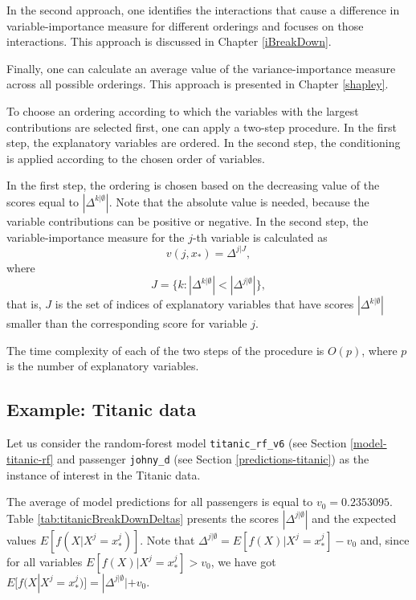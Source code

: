 \documentclass[12pt,]{krantz}
\begin{document}
In the second approach, one identifies the interactions that cause a difference in variable-importance measure for different orderings and focuses on those interactions. This approach is discussed in Chapter \ref{iBreakDown}.

Finally, one can calculate an average value of the variance-importance measure across all possible orderings. This approach is presented in Chapter \ref{shapley}.

To choose an ordering according to which the variables with the largest contributions are selected first, one can apply a two-step procedure. In the first step, the explanatory variables are ordered. In the second step, the conditioning is applied according to the chosen order of variables.

In the first step, the ordering is chosen based on the decreasing value of the scores equal to \(|\Delta^{k|\emptyset}|\). Note that the absolute value is needed, because the variable contributions can be positive or negative. In the second step, the variable-importance measure for the \(j\)-th variable is calculated as
\[
v(j, x_*) = \Delta ^{j|J},
\]
where
\[
J = \{k: |\Delta^{k|\emptyset}| < |\Delta^{j|\emptyset}|\},
\]
that is, \(J\) is the set of indices of explanatory variables that have scores \(|\Delta^{k|\emptyset}|\) smaller than the corresponding score for variable \(j\).

The time complexity of each of the two steps of the procedure is \(O(p)\), where \(p\) is the number of explanatory variables.

\hypertarget{BDExample}{%
\subsection{Example: Titanic data}\label{BDExample}}

Let us consider the random-forest model \texttt{titanic\_rf\_v6} (see Section \ref{model-titanic-rf} and passenger \texttt{johny\_d} (see Section \ref{predictions-titanic}) as the instance of interest in the Titanic data.

The average of model predictions for all passengers is equal to \(v_0 = 0.2353095\). Table \ref{tab:titanicBreakDownDeltas} presents the scores \(|\Delta^{j|\emptyset}|\) and the expected values \(E[f(X | X^j = x^j_*)]\). Note that \(\Delta^{j|\emptyset}=E[f(X) | X^j = x^j_*]-v_0\) and, since for all variables \(E[f(X) | X^j = x^j_*]>v_0\), we have got \(E[f(X | X^j = x^j_*)]=|\Delta^{j|\emptyset}|+v_0\).
\end{document}
